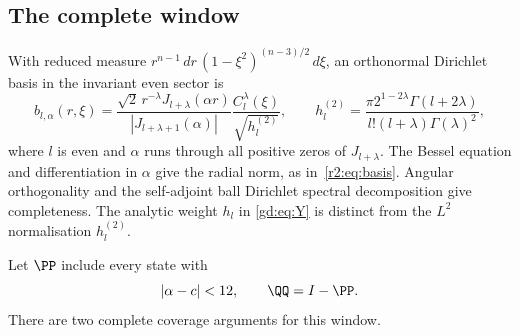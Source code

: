 \subsection{The complete window}\label{gd:sec:window}
With reduced measure
$r^{n-1}\,dr\,(1-\xi^2)^{(n-3)/2}\,d\xi$, an orthonormal Dirichlet basis
in the invariant even sector is
\begin{equation}\label{gd:eq:spectral-basis}
 b_{l,\alpha}(r,\xi)=
 \frac{\sqrt2\,r^{-\lambda}J_{l+\lambda}(\alpha r)}
 {|J_{l+\lambda+1}(\alpha)|}
 \frac{C_l^\lambda(\xi)}{\sqrt{h_l^{(2)}}},\qquad
 h_l^{(2)}=\frac{\pi2^{1-2\lambda}\Gamma(l+2\lambda)}
 {l!(l+\lambda)\Gamma(\lambda)^2},
\end{equation}
where $l$ is even and $\alpha$ runs through all positive zeros of
$J_{l+\lambda}$. The Bessel equation and differentiation in $\alpha$
give the radial norm, as in~\eqref{r2:eq:basis}.
Angular orthogonality and the self-adjoint ball Dirichlet spectral
decomposition give completeness. The analytic weight $h_l$ in
\eqref{gd:eq:Y} is distinct from the $L^2$ normalisation $h_l^{(2)}$.

Let $\PP$ include every state with
\begin{equation}\label{gd:eq:window}
 |\alpha-c|<12,\qquad \QQ=I-\PP .
\end{equation}
There are two complete coverage arguments for this window.

